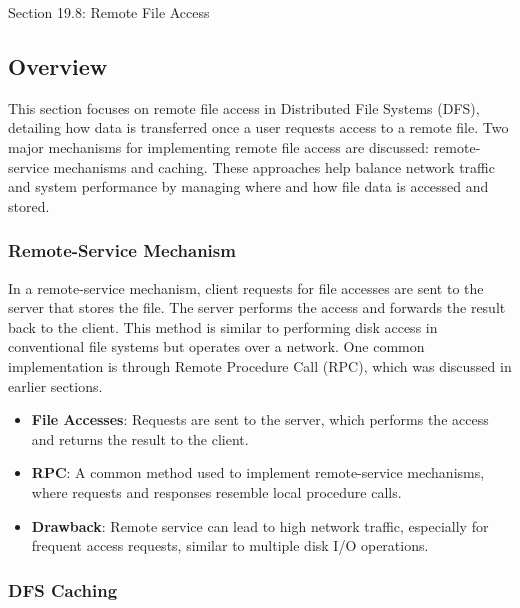 \begin{notes}{Section 19.8: Remote File Access}
    \subsection*{Overview}

    This section focuses on remote file access in Distributed File Systems (DFS), detailing how data is transferred once a user requests access to a remote file. Two major mechanisms for implementing 
    remote file access are discussed: remote-service mechanisms and caching. These approaches help balance network traffic and system performance by managing where and how file data is accessed and stored.
    
    \subsubsection*{Remote-Service Mechanism}
    
    In a remote-service mechanism, client requests for file accesses are sent to the server that stores the file. The server performs the access and forwards the result back to the client. This method 
    is similar to performing disk access in conventional file systems but operates over a network. One common implementation is through Remote Procedure Call (RPC), which was discussed in earlier sections.
    
    \begin{highlight}
    
        \begin{itemize}
            \item \textbf{File Accesses}: Requests are sent to the server, which performs the access and returns the result to the client.
            \item \textbf{RPC}: A common method used to implement remote-service mechanisms, where requests and responses resemble local procedure calls.
            \item \textbf{Drawback}: Remote service can lead to high network traffic, especially for frequent access requests, similar to multiple disk I/O operations.
        \end{itemize}
    
    \end{highlight}
    
    \subsubsection*{DFS Caching}
    

\end{notes}
